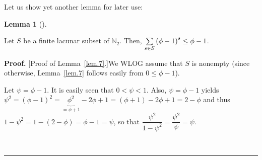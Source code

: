 \documentclass[numbers=enddot,12pt,final,onecolumn,notitlepage]{scrartcl}%
\numberwithin{exer}{section}
\theoremstyle{definition}
\newtheorem{lem}[theo]{Lemma}
\newenvironment{lemma}[1][]
{\begin{lem}[#1]\begin{leftbar}}
{\end{leftbar}\end{lem}}
\newenvironment{proof}[1][Proof]{\noindent\textbf{#1.} }{\ \rule{0.5em}{0.5em}}
\let\sumnonlimits\sum
\renewcommand{\sum}{\sumnonlimits\limits}
\begin{document}
Let us show yet another lemma for later use:

\begin{lemma}
\label{lem.7} Let $S$ be a finite lacunar subset of $\mathbb{N}_{2}$. Then,
$\sum\limits_{s\in S}\left(  \phi-1\right)  ^{s}\leq\phi-1$.
\end{lemma}

\begin{proof}
[Proof of Lemma~\ref{lem.7}.]We WLOG assume that $S$ is nonempty (since
otherwise, Lemma~\ref{lem.7} follows easily from $0\leq\phi-1$).

Let $\psi=\phi-1$. It is easily seen that $0<\psi<1$. Also, $\psi=\phi-1$
yields $\psi^{2}=\left(  \phi-1\right)  ^{2}=\underbrace{\phi^{2}}_{=\phi
+1}-2\phi+1=\left(  \phi+1\right)  -2\phi+1=2-\phi$ and thus $1-\psi
^{2}=1-\left(  2-\phi\right)  =\phi-1=\psi$, so that $\dfrac{\psi^{2}}%
{1-\psi^{2}}=\dfrac{\psi^{2}}{\psi}=\psi$.


\end{proof}
\end{document}
